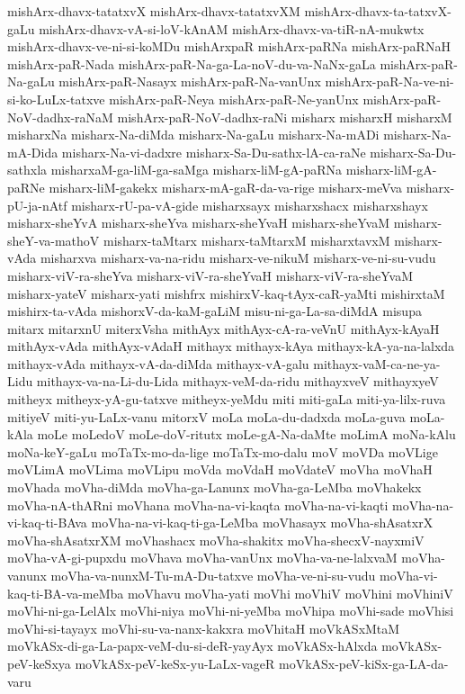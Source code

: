 {mishArx-dhavx-tatatxvX
mishArx-dhavx-tatatxvXM
mishArx-dhavx-ta-tatxvX-gaLu
mishArx-dhavx-vA-si-loV-kAnAM
mishArx-dhavx-va-tiR-nA-mukwtx
mishArx-dhavx-ve-ni-si-koMDu
mishArxpaR
mishArx-paRNa
mishArx-paRNaH
mishArx-paR-Nada
mishArx-paR-Na-ga-La-noV-du-va-NaNx-gaLa
mishArx-paR-Na-gaLu
mishArx-paR-Nasayx
mishArx-paR-Na-vanUnx
mishArx-paR-Na-ve-ni-si-ko-LuLx-tatxve
mishArx-paR-Neya
mishArx-paR-Ne-yanUnx
mishArx-paR-NoV-dadhx-raNaM
mishArx-paR-NoV-dadhx-raNi
misharx
misharxH
misharxM
misharxNa
misharx-Na-diMda
misharx-Na-gaLu
misharx-Na-mADi
misharx-Na-mA-Dida
misharx-Na-vi-dadxre
misharx-Sa-Du-sathx-lA-ca-raNe
misharx-Sa-Du-sathxla
misharxaM-ga-liM-ga-saMga
misharx-liM-gA-paRNa
misharx-liM-gA-paRNe
misharx-liM-gakekx
misharx-mA-gaR-da-va-rige
misharx-meVva
misharx-pU-ja-nAtf
misharx-rU-pa-vA-gide
misharxsayx
misharxshacx
misharxshayx
misharx-sheYvA
misharx-sheYva
misharx-sheYvaH
misharx-sheYvaM
misharx-sheY-va-mathoV
misharx-taMtarx
misharx-taMtarxM
misharxtavxM
misharx-vAda
misharxva
misharx-va-na-ridu
misharx-ve-nikuM
misharx-ve-ni-su-vudu
misharx-viV-ra-sheYva
misharx-viV-ra-sheYvaH
misharx-viV-ra-sheYvaM
misharx-yateV
misharx-yati
mishfrx
mishirxV-kaq-tAyx-caR-yaMti
mishirxtaM
mishirx-ta-vAda
mishorxV-da-kaM-gaLiM
misu-ni-ga-La-sa-diMdA
misupa
mitarx
mitarxnU
miterxVsha
mithAyx
mithAyx-cA-ra-veVnU
mithAyx-kAyaH
mithAyx-vAda
mithAyx-vAdaH
mithayx
mithayx-kAya
mithayx-kA-ya-na-lalxda
mithayx-vAda
mithayx-vA-da-diMda
mithayx-vA-galu
mithayx-vaM-ca-ne-ya-Lidu
mithayx-va-na-Li-du-Lida
mithayx-veM-da-ridu
mithayxveV
mithayxyeV
mitheyx
mitheyx-yA-gu-tatxve
mitheyx-yeMdu
miti
miti-gaLa
miti-ya-lilx-ruva
mitiyeV
miti-yu-LaLx-vanu
mitorxV
moLa
moLa-du-dadxda
moLa-guva
moLa-kAla
moLe
moLedoV
moLe-doV-ritutx
moLe-gA-Na-daMte
moLimA
moNa-kAlu
moNa-keY-gaLu
moTaTx-mo-da-lige
moTaTx-mo-dalu
moV
moVDa
moVLige
moVLimA
moVLima
moVLipu
moVda
moVdaH
moVdateV
moVha
moVhaH
moVhada
moVha-diMda
moVha-ga-Lanunx
moVha-ga-LeMba
moVhakekx
moVha-nA-thARni
moVhana
moVha-na-vi-kaqta
moVha-na-vi-kaqti
moVha-na-vi-kaq-ti-BAva
moVha-na-vi-kaq-ti-ga-LeMba
moVhasayx
moVha-shAsatxrX
moVha-shAsatxrXM
moVhashacx
moVha-shakitx
moVha-shecxV-nayxmiV
moVha-vA-gi-pupxdu
moVhava
moVha-vanUnx
moVha-va-ne-lalxvaM
moVha-vanunx
moVha-va-nunxM-Tu-mA-Du-tatxve
moVha-ve-ni-su-vudu
moVha-vi-kaq-ti-BA-va-meMba
moVhavu
moVha-yati
moVhi
moVhiV
moVhini
moVhiniV
moVhi-ni-ga-LelAlx
moVhi-niya
moVhi-ni-yeMba
moVhipa
moVhi-sade
moVhisi
moVhi-si-tayayx
moVhi-su-va-nanx-kakxra
moVhitaH
moVkASxMtaM
moVkASx-di-ga-La-papx-veM-du-si-deR-yayAyx
moVkASx-hAlxda
moVkASx-peV-keSxya
moVkASx-peV-keSx-yu-LaLx-vageR
moVkASx-peV-kiSx-ga-LA-da-varu
}
